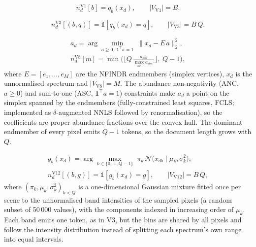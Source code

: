 \begin{equation}\label{eq:v1}
n_d^{\mathrm{V1}}[b] = q_b(x_d),\qquad |V_{\mathrm{V1}}| = B.
\end{equation}

\begin{equation}\label{eq:v3}
n_d^{\mathrm{V3}}[(b,q)] = \mathds{1}\!\left[q_b(x_d)=q\right],\qquad
|V_{\mathrm{V3}}| = B\,Q .
\end{equation}

\begin{equation}\label{eq:v8}
\begin{gathered}
a_d=\arg\min_{a\ge 0,\;\mathbf{1}^{\top}a=1}\;\lVert x_d - E\,a\rVert_2^2,\\
n_d^{\mathrm{V8}}[m]=\min\!\Big(\Big\lfloor Q\,\frac{a_{dm}}{\max_{m'} a_{dm'}}\Big\rfloor,\;Q-1\Big),
\end{gathered}
\end{equation}
where $E=[e_1,\dots,e_M]$ are the NFINDR endmembers (simplex vertices),
$x_d$ is the unnormalised spectrum and $|V_{\mathrm{V8}}|=M$. The abundance
non-negativity (ANC, $a\ge 0$) and sum-to-one (ASC, $\mathbf{1}^{\top}a=1$)
constraints make $a_d$ a point on the simplex spanned by the endmembers
(fully-constrained least squares, FCLS; implemented as
$\delta$-augmented NNLS followed by renormalisation), so the coefficients
are proper abundance fractions over the convex hull. The dominant
endmember of every pixel emits $Q-1$ tokens, so the document length
grows with $Q$.

\begin{equation}\label{eq:v12}
\begin{gathered}
g_b(x_d)=\arg\max_{k\in\{0,\dots,Q-1\}}\;\pi_k\,\mathcal{N}\big(x_{db}\mid\mu_k,\sigma_k^2\big),\\
n_d^{\mathrm{V12}}[(b,g)]=\mathds{1}\!\left[g_b(x_d)=g\right],\qquad
|V_{\mathrm{V12}}|=B\,Q,
\end{gathered}
\end{equation}
where $(\pi_k,\mu_k,\sigma_k^2)_{k<Q}$ is a one-dimensional Gaussian
mixture fitted once per scene to the unnormalised band intensities of the
sampled pixels (a random subset of 50\,000 values), with the components
indexed in increasing order of $\mu_k$. Each band emits one token, as in
V3, but the bins are shared by all pixels and follow the intensity
distribution instead of splitting each spectrum's own range into equal
intervals.

